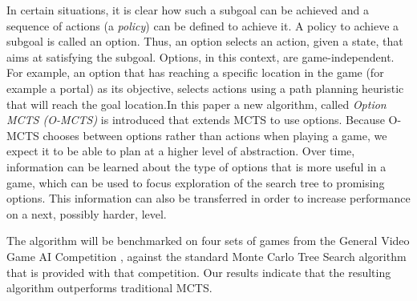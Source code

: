 In certain situations, it is clear how such a subgoal can be achieved and a
sequence of actions (a \emph{policy}) can be defined to achieve it. A policy to
achieve a subgoal is called an option. Thus, an option selects an action, given
a state, that aims at satisfying the subgoal.  Options, in this context, are
game-independent. For example, an option that has reaching a specific location
in the game (for example a portal) as its objective, selects actions using a
path planning heuristic that will reach the goal location.In this paper a new
algorithm, called \emph{Option MCTS (O-MCTS)} is introduced that extends MCTS to
use options. Because O-MCTS chooses between options rather than actions when
playing a game, we expect it to be able to plan at a higher level of
abstraction. Over time, information can be learned about the type of options
that is more useful in a game, which can be used to focus exploration of the
search tree to promising options. This information can also be transferred in
order to increase performance on a next, possibly harder, level. 

The algorithm will be benchmarked on four sets of games from the General Video
Game AI Competition \cite{perez2014}, against the standard Monte Carlo Tree
Search algorithm that is provided with that competition.  Our results indicate
that the resulting algorithm outperforms traditional MCTS.

